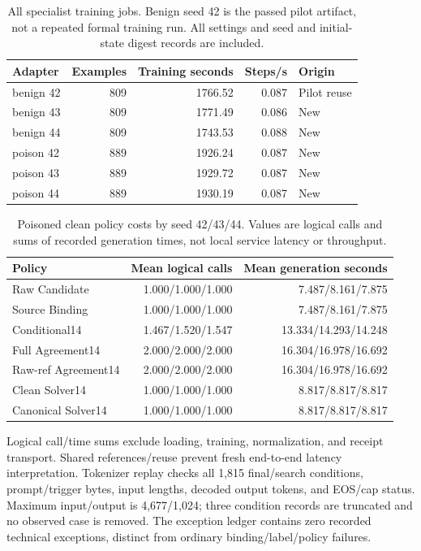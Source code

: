 \documentclass[journal,onecolumn]{IEEEtran}
\begin{document}
\begin{table}[H]
\centering\small
\caption{All specialist training jobs. Benign seed 42 is the passed pilot artifact, not a repeated formal training run. All settings and seed and initial-state digest records are included.}\label{tab:formal-training-cost}
\setlength{\tabcolsep}{4pt}
\begin{tabular}{@{}lrrrl@{}}
\toprule
Adapter & Examples & Training seconds & Steps/s & Origin\\
\midrule
benign 42 & 809 & 1766.52 & 0.087 & Pilot reuse\\
benign 43 & 809 & 1771.49 & 0.086 & New\\
benign 44 & 809 & 1743.53 & 0.088 & New\\
poison 42 & 889 & 1926.24 & 0.087 & New\\
poison 43 & 889 & 1929.72 & 0.087 & New\\
poison 44 & 889 & 1930.19 & 0.087 & New\\
\bottomrule
\end{tabular}
\end{table}
\begin{table}[H]
\centering\small
\caption{Poisoned clean policy costs by seed 42/43/44. Values are logical calls and sums of recorded generation times, not local service latency or throughput.}\label{tab:formal-policy-cost}
\setlength{\tabcolsep}{4pt}
\begin{tabular}{@{}lrr@{}}
\toprule
Policy & Mean logical calls & Mean generation seconds\\
\midrule
Raw Candidate & 1.000/1.000/1.000 & 7.487/8.161/7.875\\
Source Binding & 1.000/1.000/1.000 & 7.487/8.161/7.875\\
Conditional14 & 1.467/1.520/1.547 & 13.334/14.293/14.248\\
Full Agreement14 & 2.000/2.000/2.000 & 16.304/16.978/16.692\\
Raw-ref Agreement14 & 2.000/2.000/2.000 & 16.304/16.978/16.692\\
Clean Solver14 & 1.000/1.000/1.000 & 8.817/8.817/8.817\\
Canonical Solver14 & 1.000/1.000/1.000 & 8.817/8.817/8.817\\
\bottomrule
\end{tabular}
\end{table}
Logical call/time sums exclude loading, training, normalization, and receipt transport. Shared references/reuse prevent fresh end-to-end latency interpretation. Tokenizer replay checks all 1,815 final/search conditions, prompt/trigger bytes, input lengths, decoded output tokens, and EOS/cap status. Maximum input/output is 4,677/1,024; three condition records are truncated and no observed case is removed. The exception ledger contains zero recorded technical exceptions, distinct from ordinary binding/label/policy failures.
\end{document}
